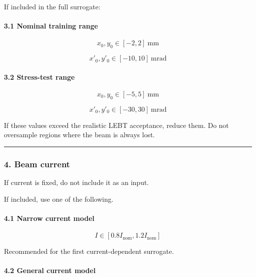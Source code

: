 \documentclass[
]{article}
\begin{document}
If included in the full surrogate:

\hypertarget{nominal-training-range}{%
\paragraph{3.1 Nominal training range}\label{nominal-training-range}}

\[
x_0,y_0 \in [-2,2]\ \mathrm{mm}
\]

\[
x'_0,y'_0 \in [-10,10]\ \mathrm{mrad}
\]

\hypertarget{stress-test-range-1}{%
\paragraph{3.2 Stress-test range}\label{stress-test-range-1}}

\[
x_0,y_0 \in [-5,5]\ \mathrm{mm}
\]

\[
x'_0,y'_0 \in [-30,30]\ \mathrm{mrad}
\]

If these values exceed the realistic LEBT acceptance, reduce them. Do
not oversample regions where the beam is always lost.

\begin{center}\rule{0.5\linewidth}{0.5pt}\end{center}

\hypertarget{beam-current}{%
\subsubsection{4. Beam current}\label{beam-current}}

If current is fixed, do not include it as an input.

If included, use one of the following.

\hypertarget{narrow-current-model}{%
\paragraph{4.1 Narrow current model}\label{narrow-current-model}}

\[
I \in [0.8I_{\mathrm{nom}},1.2I_{\mathrm{nom}}]
\]

Recommended for the first current-dependent surrogate.

\hypertarget{general-current-model}{%
\paragraph{4.2 General current model}\label{general-current-model}}
\end{document}
